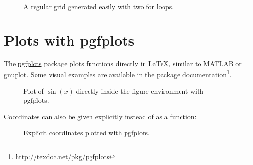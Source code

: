\documentclass[../thesis-example-en]{subfiles}
\begin{document}
\begin{ltgexample}
\begin{figure}[ht]
  \centering
  \caption{A regular grid generated easily with two for loops.}\label{fig:tikz_example}
\end{figure}
\end{ltgexample}

\section{Plots with pgfplots}

The \href{https://ctan.org/pkg/pgfplots}{pgfplots} package plots functions directly in \LaTeX{}, similar to MATLAB or gnuplot.
Some visual examples are available in the package documentation\footnote{\url{http://texdoc.net/pkg/pgfplots}}.

\begin{ltgexample}
\begin{figure}[ht]
  \centering
  \caption{Plot of $\sin(x)$ directly inside the figure environment with pgfplots.}
  \label{fig:pgfplots_example}
\end{figure}
\end{ltgexample}

Coordinates can also be given explicitly instead of as a function:
\begin{ltgexample}
\begin{figure}[ht]
  \centering
  \caption{Explicit coordinates plotted with pgfplots.}
  \label{fig:pgfplots_coords}
\end{figure}
\end{ltgexample}
\end{document}
